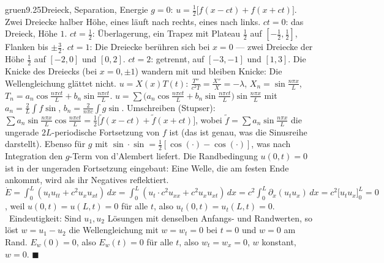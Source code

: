 \begin{loesungkarte}{gruen}{9.25}{Dreieck, Separation, Energie}
$g = 0$: $u = \frac12\bigl[f(x - ct) + f(x + ct)\bigr]$. Zwei Dreiecke halber Höhe, eines läuft nach rechts, eines nach links. $ct = 0$: das Dreieck, Höhe $1$. $ct = \frac12$: Überlagerung, ein Trapez mit Plateau $\frac12$ auf $[-\frac12, \frac12]$, Flanken bis $\pm\frac32$. $ct = 1$: Die Dreiecke berühren sich bei $x = 0$ --- zwei Dreiecke der Höhe $\frac12$ auf $[-2, 0]$ und $[0, 2]$. $ct = 2$: getrennt, auf $[-3, -1]$ und $[1, 3]$. Die Knicke des Dreiecks (bei $x = 0, \pm1$) wandern mit und bleiben Knicke: Die Wellengleichung glättet nicht.
$u = X(x)T(t)$: $\frac{T''}{c^{2}T} = \frac{X''}X = -\lambda$, $X_n = \sin\frac{n\pi x}L$, $T_n = a_n\cos\frac{n\pi ct}L + b_n\sin\frac{n\pi ct}L$. $u = \sum\bigl(a_n\cos\frac{n\pi ct}L + b_n\sin\frac{n\pi ct}L\bigr)\sin\frac{n\pi x}L$ mit $a_n = \frac2L\int f\sin$, $b_n = \frac2{n\pi c}\int g\sin$. Umschreiben (Stupser): $\sum a_n\sin\frac{n\pi x}L\cos\frac{n\pi ct}L = \frac12\bigl[\tilde f(x - ct) + \tilde f(x + ct)\bigr]$, wobei $\tilde f = \sum a_n\sin\frac{n\pi x}L$ die ungerade $2L$-periodische Fortsetzung von $f$ ist (das ist genau, was die Sinusreihe darstellt). Ebenso für $g$ mit $\sin\cdot\sin = \frac12[\cos(\cdot) - \cos(\cdot)]$, was nach Integration den $g$-Term von d'Alembert liefert. Die Randbedingung $u(0, t) = 0$ ist in der ungeraden Fortsetzung eingebaut: Eine Welle, die am festen Ende ankommt, wird als ihr Negatives reflektiert.
$\dot E = \int_0^{L}(u_tu_{tt} + c^{2}u_xu_{xt})\,dx = \int_0^{L}(u_t\cdot c^{2}u_{xx} + c^{2}u_xu_{xt})\,dx = c^{2}\int_0^{L}\partial_x(u_tu_x)\,dx = c^{2}\bigl[u_tu_x\bigr]_0^{L} = 0$, weil $u(0, t) = u(L, t) = 0$ für alle $t$, also $u_t(0, t) = u_t(L, t) = 0$. \checkmark\ Eindeutigkeit: Sind $u_1, u_2$ Lösungen mit denselben Anfangs- und Randwerten, so löst $w = u_1 - u_2$ die Wellengleichung mit $w = w_t = 0$ bei $t = 0$ und $w = 0$ am Rand. $E_w(0) = 0$, also $E_w(t) = 0$ für alle $t$, also $w_t = w_x = 0$, $w$ konstant, $w = 0$. $\blacksquare$

\end{loesungkarte}
